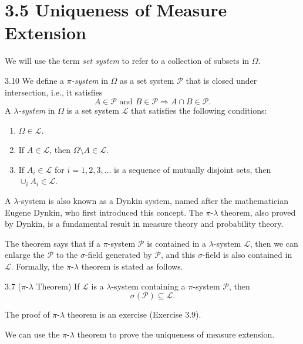 \section*{3.5 Uniqueness of Measure Extension}

We will use the term \textit{set system} to refer to a collection of subsets in $\Omega$.

\begin{defbox}{3.10}
We define a \textit{$\pi$-system} in $\Omega$ as a set system $\mathcal{P}$ that is closed under intersection, i.e., it satisfies
\[
A \in \mathcal{P} \text{ and } B \in \mathcal{P} \Rightarrow A \cap B \in \mathcal{P}.
\]
A \textit{$\lambda$-system} in $\Omega$ is a set system $\mathcal{L}$ that satisfies the following conditions:
\begin{enumerate}[label=(\roman*)]
    \item $\Omega \in \mathcal{L}$.
    \item If $A \in \mathcal{L}$, then $\Omega \setminus A \in \mathcal{L}$.
    \item If $A_i \in \mathcal{L}$ for $i = 1, 2, 3, \dots$ is a sequence of mutually disjoint sets, then $\cup_i A_i \in \mathcal{L}$.
\end{enumerate}
\end{defbox}

A $\lambda$-system is also known as a Dynkin system, named after the mathematician Eugene Dynkin, who first introduced this concept. The $\pi$-$\lambda$ theorem, also proved by Dynkin, is a fundamental result in measure theory and probability theory.

The theorem says that if a $\pi$-system $\mathcal{P}$ is contained in a $\lambda$-system $\mathcal{L}$, then we can enlarge the $\mathcal{P}$ to the $\sigma$-field generated by $\mathcal{P}$, and this $\sigma$-field is also contained in $\mathcal{L}$. Formally, the $\pi$-$\lambda$ theorem is stated as follows.

\begin{thmbox}{3.7 ($\pi$-$\lambda$ Theorem)}
If $\mathcal{L}$ is a $\lambda$-system containing a $\pi$-system $\mathcal{P}$, then
\[
\sigma(\mathcal{P}) \subseteq \mathcal{L}.
\]
\end{thmbox}

The proof of $\pi$-$\lambda$ theorem is an exercise (Exercise 3.9).

We can use the $\pi$-$\lambda$ theorem to prove the uniqueness of measure extension.

